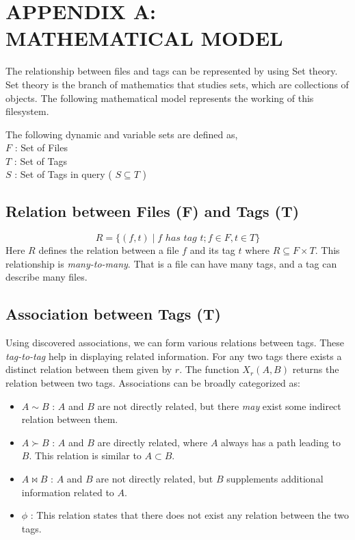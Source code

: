 \section{APPENDIX A: MATHEMATICAL MODEL}
The relationship between files and tags can be represented by using Set theory. Set theory is the branch of mathematics that studies sets, which are collections of objects. The following mathematical model represents the working of this filesystem. 

\noindent The following dynamic and variable sets are defined as, \\
\indent $F$	: Set of Files \\
\indent $T$	: Set of Tags \\
\indent $S$	: Set of Tags in query ( $S \subseteq T$ ) \\

\subsection{Relation between Files (F) and Tags (T)}
$$ R = \{(f,t) \mid f \,\, has \,\, tag \,\,t; f \in F, t \in T\}$$
Here $R$ defines the relation between a file $f$ and its tag $t$ where $R \subseteq F \times T$. This relationship is \emph{many-to-many}. 
That is a file can have many tags, and a tag can describe many files.

\subsection{Association between Tags (T)}
Using discovered associations, we can form various relations between tags. These \emph{tag-to-tag} help in displaying related information. For any two tags there exists a distinct relation between them given by $r$. The function $X_{r}(A,B)$ returns the relation between two tags. Associations can be broadly categorized as:
\begin{itemize}
\item {$A \sim B$} : $A$ and $B$ are not directly related, but there \emph{may} exist some indirect relation between them.
\item $A \succ B$ : $A$ and $B$ are directly related, where $A$ always has a path leading to $B$. This relation is similar to $A \subset B$.
\item $A \bowtie B$ : $A$ and $B$ are not directly related, but $B$ supplements additional information related to $A$.
\item $\phi$ : This relation states that there does not exist any relation between the two tags.
\end{itemize}


